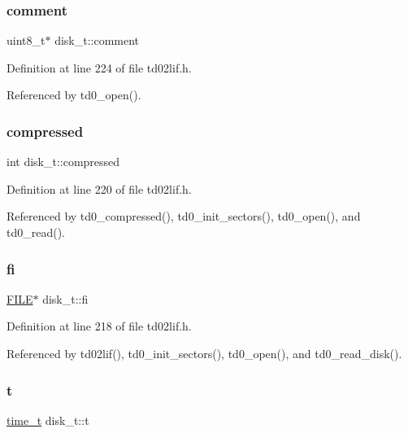 \subsubsection{\texorpdfstring{comment}{comment}}
{\footnotesize\ttfamily uint8\+\_\+t$\ast$ disk\+\_\+t\+::comment}



Definition at line 224 of file td02lif.\+h.



Referenced by td0\+\_\+open().

\mbox{\label{structdisk__t_abe333f1a8b322fbed0d1c1178939016e}} 
\subsubsection{\texorpdfstring{compressed}{compressed}}
{\footnotesize\ttfamily int disk\+\_\+t\+::compressed}



Definition at line 220 of file td02lif.\+h.



Referenced by td0\+\_\+compressed(), td0\+\_\+init\+\_\+sectors(), td0\+\_\+open(), and td0\+\_\+read().

\mbox{\label{structdisk__t_a1832d0f8cdda8f731de9e1daea2900a5}} 
\subsubsection{\texorpdfstring{fi}{fi}}
{\footnotesize\ttfamily \hyperlink{posix_8h_aed4dabeb9f7c518ded42f930a04abce8}{F\+I\+LE}$\ast$ disk\+\_\+t\+::fi}



Definition at line 218 of file td02lif.\+h.



Referenced by td02lif(), td0\+\_\+init\+\_\+sectors(), td0\+\_\+open(), and td0\+\_\+read\+\_\+disk().

\mbox{\label{structdisk__t_a6cb7e0306f35b8b97bf3ef18e2f45455}} 
\subsubsection{\texorpdfstring{t}{t}}
{\footnotesize\ttfamily \hyperlink{time_8h_a3346b04b0420b32ccf6b706551b70762}{time\+\_\+t} disk\+\_\+t\+::t}



